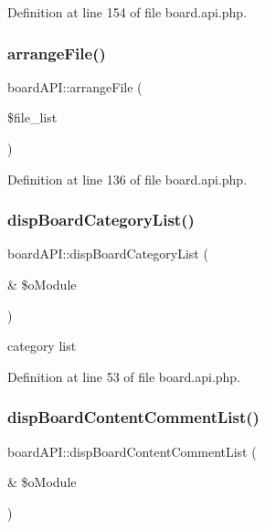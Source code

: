 Definition at line 154 of file board.\+api.\+php.

\hypertarget{classboardAPI_a01e0faec8a6509f75271f226c9be5004}{}\label{classboardAPI_a01e0faec8a6509f75271f226c9be5004} 
\subsubsection{\texorpdfstring{arrange\+File()}{arrangeFile()}}
{\footnotesize\ttfamily board\+A\+P\+I\+::arrange\+File (\begin{DoxyParamCaption}\item[{}]{\$file\+\_\+list }\end{DoxyParamCaption})}



Definition at line 136 of file board.\+api.\+php.

\hypertarget{classboardAPI_aa527b1afc48bacd728b5d95e969a60f6}{}\label{classboardAPI_aa527b1afc48bacd728b5d95e969a60f6} 
\subsubsection{\texorpdfstring{disp\+Board\+Category\+List()}{dispBoardCategoryList()}}
{\footnotesize\ttfamily board\+A\+P\+I\+::disp\+Board\+Category\+List (\begin{DoxyParamCaption}\item[{\&}]{\$o\+Module }\end{DoxyParamCaption})}



category list 



Definition at line 53 of file board.\+api.\+php.

\hypertarget{classboardAPI_af5b1506259e5aaec1b6f743ac6548203}{}\label{classboardAPI_af5b1506259e5aaec1b6f743ac6548203} 
\subsubsection{\texorpdfstring{disp\+Board\+Content\+Comment\+List()}{dispBoardContentCommentList()}}
{\footnotesize\ttfamily board\+A\+P\+I\+::disp\+Board\+Content\+Comment\+List (\begin{DoxyParamCaption}\item[{\&}]{\$o\+Module }\end{DoxyParamCaption})}



